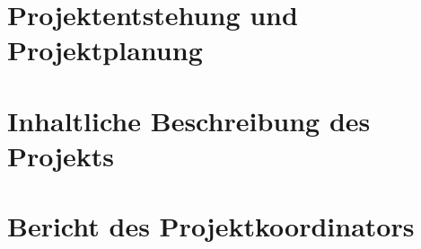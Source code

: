 \documentclass[12pt]{report}
\begin{document}


\tableofcontents

\parindent 0pt
\parskip 12pt

\chapter{Projektentstehung und Projektplanung}


\chapter{Inhaltliche Beschreibung des Projekts}


\chapter{Bericht des Projektkoordinators}


\listoffigures
\listoftables
{}

\end{document}
